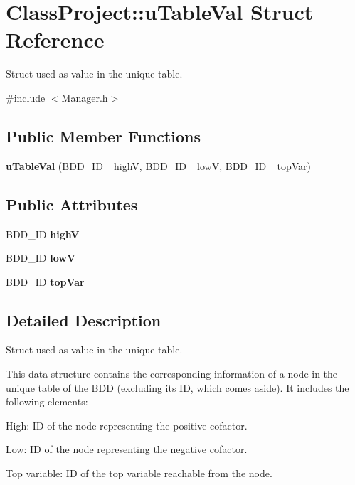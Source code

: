 \hypertarget{structClassProject_1_1uTableVal}{}\section{Class\+Project\+:\+:u\+Table\+Val Struct Reference}
\label{structClassProject_1_1uTableVal}


Struct used as value in the unique table.  




{\ttfamily \#include $<$Manager.\+h$>$}

\subsection*{Public Member Functions}
\begin{DoxyCompactItemize}
\item 
\mbox{\label{structClassProject_1_1uTableVal_a63378667dd6920a1d6ab2831eab7d17f}} 
{\bfseries u\+Table\+Val} (B\+D\+D\+\_\+\+ID \+\_\+highV, B\+D\+D\+\_\+\+ID \+\_\+lowV, B\+D\+D\+\_\+\+ID \+\_\+top\+Var)
\end{DoxyCompactItemize}
\subsection*{Public Attributes}
\begin{DoxyCompactItemize}
\item 
\mbox{\label{structClassProject_1_1uTableVal_aec6c964e6a8284ff09eba51260548126}} 
B\+D\+D\+\_\+\+ID {\bfseries highV}
\item 
\mbox{\label{structClassProject_1_1uTableVal_a69dc988fc82c3d96902402fa6247ec22}} 
B\+D\+D\+\_\+\+ID {\bfseries lowV}
\item 
\mbox{\label{structClassProject_1_1uTableVal_ab659596f0cc616efd1cb43f14b6a1bd2}} 
B\+D\+D\+\_\+\+ID {\bfseries top\+Var}
\end{DoxyCompactItemize}


\subsection{Detailed Description}
Struct used as value in the unique table. 

This data structure contains the corresponding information of a node in the unique table of the B\+DD (excluding its ID, which comes aside). It includes the following elements\+:
\begin{DoxyItemize}
\item High\+: ID of the node representing the positive cofactor.
\item Low\+: ID of the node representing the negative cofactor.
\item Top variable\+: ID of the top variable reachable from the node. 
\end{DoxyItemize}